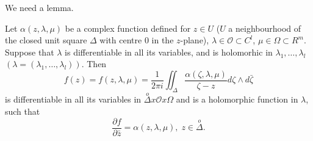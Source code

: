 We need a lemma.

\begin{lemma*}
Let $\alpha(z, \lambda, \mu)$ be a complex function defined for $z \in
U$ ($U$ a neighbourhood of the closed unit square $\Delta$ with centre
$0$ in the $z$-plane), $\lambda \in \mathscr{O} \subset C^l$, $\mu \in
\Omega \subset R^m$. Suppose that $\lambda$ is differentiable in all
its variables, and is holomorhic in $\lambda_1, \ldots, \lambda_l$
$(\lambda = (\lambda_1, \ldots, \lambda_l))$. 
Then
$$
f(z) = f(z, \lambda, \mu) = \frac{1}{2\pi i} \iint_\Delta
\frac{\alpha(\zeta, \lambda, \mu)}{\zeta-z} d \zeta \wedge d
\bar{\zeta} 
$$
is differentiable in all its variables in $\overset{o}{\Delta} x
\mathscr{O} x \Omega$ and is a holomorphic function in $\lambda$, such
that
$$
\frac{\partial f}{\partial \bar{z}} = \alpha (z, \lambda, \mu), \; z
\in \overset{o}{\Delta}. 
$$
\end{lemma*}
 

